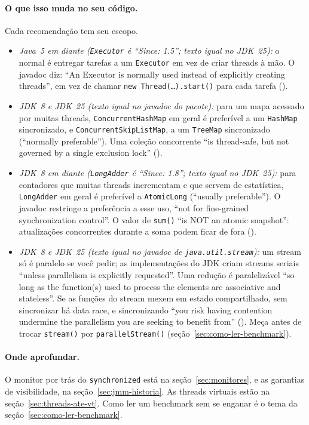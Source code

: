 \paragraph{O que isso muda no seu código.}
Cada recomendação tem seu escopo.
\begin{itemize}
\item \emph{Java~5 em diante (\texttt{Executor} é \enquote{Since:
  1.5}; texto igual no JDK~25):} o normal é entregar tarefas a um
  \texttt{Executor} em vez de criar threads à mão. O javadoc diz:
  \enquote{An Executor is normally used instead of explicitly creating
  threads}, em vez de chamar \texttt{new Thread(\ldots).start()} para
  cada tarefa ().
\item \emph{JDK~8 e JDK~25 (texto igual no javadoc do pacote):} para
  um mapa acessado por muitas threads, \texttt{ConcurrentHashMap} em
  geral é preferível a um \texttt{HashMap} sincronizado, e
  \texttt{ConcurrentSkipListMap}, a um \texttt{TreeMap} sincronizado
  (\enquote{normally preferable}). Uma coleção concorrente \enquote{is thread-safe, but
  not governed by a single exclusion lock}
  ().
\item \emph{JDK~8 em diante (\texttt{LongAdder} é \enquote{Since:
  1.8}; texto igual no JDK~25):} para contadores que muitas threads
  incrementam e que servem de estatística, \texttt{LongAdder} em geral
  é preferível a \texttt{AtomicLong} (\enquote{usually preferable}).
  O javadoc restringe a preferência a esse uso, \enquote{not for
  fine-grained synchronization control}. O valor de \texttt{sum()} \enquote{is NOT
  an atomic snapshot}: atualizações concorrentes durante a soma podem
  ficar de fora ().
\item \emph{JDK~8 e JDK~25 (texto igual no javadoc de
  \texttt{java.util.stream}):} um stream só é paralelo se você pedir;
  as implementações do JDK criam streams seriais \enquote{unless
  parallelism is explicitly requested}. Uma redução é paralelizável
  \enquote{so long as the function(s) used to process the elements are
  associative and stateless}. Se as funções do stream mexem em estado
  compartilhado, sem sincronizar há data race, e sincronizando
  \enquote{you risk having contention undermine the parallelism you are
  seeking to benefit from} (). Meça
  antes de trocar \texttt{stream()} por \texttt{parallelStream()}
  (seção~\ref{sec:como-ler-benchmark}).
\end{itemize}



\paragraph{Onde aprofundar.}
O monitor por trás do \texttt{synchronized} está na
seção~\ref{sec:monitores}, e as garantias de visibilidade, na
seção~\ref{sec:jmm-historia}. As threads virtuais estão na
seção~\ref{sec:threads-ate-vt}.
Como ler um benchmark sem se enganar é o tema da
seção~\ref{sec:como-ler-benchmark}.
